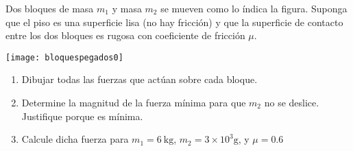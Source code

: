 \ejercicio{}
\begin{frame}
 Dos bloques de masa $m_1$ y masa $m_2$ se mueven como lo índica la figura. Suponga que el piso es una superficie lisa (no hay fricción) y que la superficie de contacto entre los dos bloques es rugosa con coeficiente de fricción  $\mu$.

  \begin{minipage}{0.4\linewidth}
    \texttt{[image: bloquespegados0]}
  \end{minipage}
  \begin{minipage}{0.6\linewidth}
    \begin{enumerate}
    \item Dibujar todas las fuerzas que actúan sobre cada bloque.
      \label{item:dp1a}
    \item Determine la magnitud de la fuerza mínima para que $m_2$ no se deslice. Justifique porque es mínima.
      \label{item:dp1b}
    \item Calcule dicha fuerza para $m_1=\SI{6}{\kilo\gram}$, $m_2=3\times 10^3\si{\gram}$, y $\mu=0.6$
      \label{item:dp1c}
    \end{enumerate}
  \end{minipage}
\end{frame}
